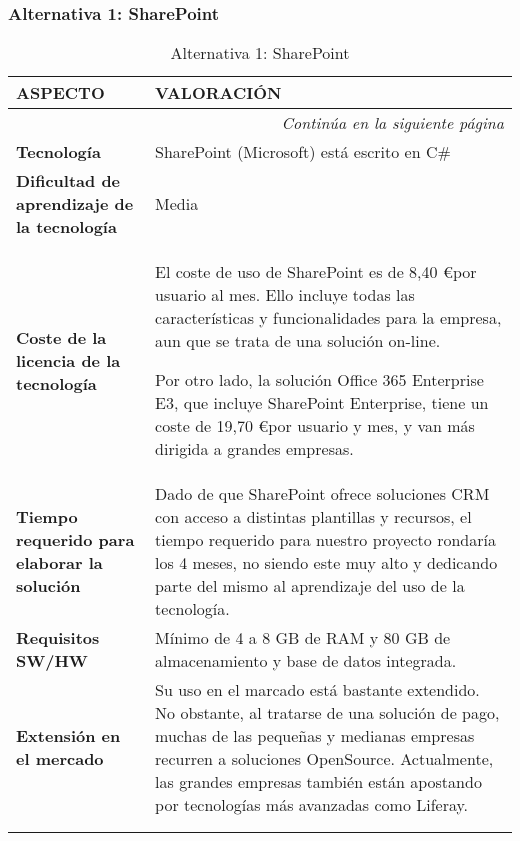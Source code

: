 \subsubsection{Alternativa 1: SharePoint}

\begin{center}
\begin{longtable}{p{4cm} p{8cm}}

\textbf{ASPECTO} & \textbf{VALORACIÓN} \\ \hline \hline
\endfirsthead
\endhead

\multicolumn{2}{r}{\textit{Continúa en la siguiente página}} \\
\endfoot
\endlastfoot

\textbf{Tecnología} & SharePoint (Microsoft) está escrito en C#\\ \hline

\textbf{Dificultad de aprendizaje de la tecnología} & Media\\ \hline

\textbf{Coste de la licencia de la tecnología} &
\par El coste de uso de SharePoint es de 8,40 \euro por usuario al mes. Ello incluye todas las características y funcionalidades para la empresa, aun que se trata de una solución on-line.
\par Por otro lado, la solución Office 365 Enterprise E3, que incluye SharePoint Enterprise, tiene un coste de 19,70 \euro por usuario y mes, y van más dirigida a grandes empresas.
\\ \hline

\textbf{Tiempo requerido para elaborar la solución} & Dado de que SharePoint ofrece soluciones CRM con acceso a distintas plantillas y recursos, el tiempo requerido para nuestro proyecto rondaría los 4 meses, no siendo este muy alto y dedicando parte del mismo al aprendizaje del uso de la tecnología.\\ \hline

\textbf{Requisitos SW/HW} & Mínimo de 4 a 8 GB de RAM y 80 GB de almacenamiento y base de datos integrada.\\ \hline

\textbf{Extensión en el mercado} & Su uso en el marcado está bastante extendido. No obstante, al tratarse de una solución de pago, muchas de las pequeñas y medianas empresas recurren a soluciones OpenSource. Actualmente, las grandes empresas también están apostando por tecnologías más avanzadas como Liferay.\\ \hline \hline


\caption{Alternativa 1: SharePoint}\\
\label{tab:alternative1}
\end{longtable}
\end{center}

